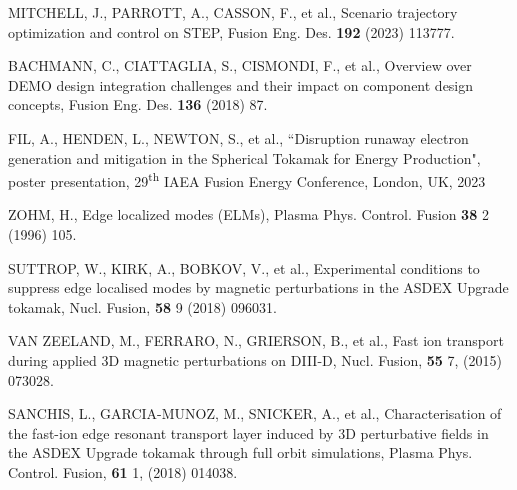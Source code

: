 \documentclass[10pt, a4paper, twoside]{article}
\begin{document}
\begin{thebibliography}{9}
    MITCHELL, J., PARROTT, A., CASSON, F., et al.,
    Scenario trajectory optimization and control on STEP,
    Fusion Eng. Des.
    \textbf{192} 
    (2023) 
    113777.

    BACHMANN, C., CIATTAGLIA, S., CISMONDI, F., et al., 
    Overview over DEMO design integration challenges and their impact on component design concepts, 
    Fusion Eng. Des. 
    \textbf{136} 
    (2018)
    87.

    FIL, A., HENDEN, L., NEWTON, S., et al.,
    ``Disruption runaway electron generation and mitigation in the Spherical Tokamak for Energy Production",
    poster presentation, 
    29\textsuperscript{th} IAEA Fusion Energy Conference,
    London, UK, 
    2023

    ZOHM, H., 
    Edge localized modes (ELMs), 
    Plasma Phys. Control. Fusion 
    \textbf{38} 2 
    (1996) 
    105.

    SUTTROP, W., KIRK, A., BOBKOV, V., et al.,
    Experimental conditions to suppress edge localised modes by magnetic perturbations in the ASDEX Upgrade tokamak,
    Nucl. Fusion,
    \textbf{58} 9 
    (2018) 
    096031.
    
    VAN ZEELAND, M., FERRARO, N., GRIERSON, B., et al.,
    Fast ion transport during applied 3D magnetic perturbations on DIII-D,
    Nucl. Fusion,
    \textbf{55} 7,
    (2015)
    073028.

    SANCHIS, L., GARCIA-MUNOZ, M., SNICKER, A., et al.,
    Characterisation of the fast-ion edge resonant transport layer induced by 3D perturbative fields in the ASDEX Upgrade tokamak through full orbit simulations,
    Plasma Phys. Control. Fusion,
    \textbf{61} 1,
    (2018)
    014038.
    

\end{thebibliography}
\end{document}
